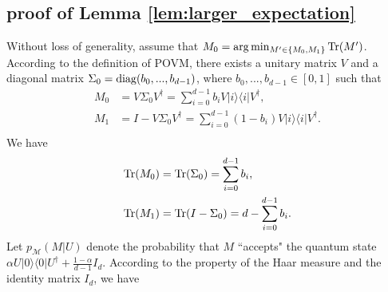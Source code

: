 \subsection{proof of Lemma \ref{lem:larger_expectation}}
\label{subsection: proof of lemma larger expectation}
    Without loss of generality, assume that $M_0 = \arg\min_{M' \in \{M_0,M_1\}} \mathrm{Tr}(M')$.  According to the definition of POVM, there exists a unitary matrix \( V \) and a diagonal matrix $ \Sigma_0 = \mathrm{diag}(b_0,...,b_{d-1})$, where $b_0,...,b_{d-1} \in [0,1]$ such that
    \begin{equation*}
        \begin{aligned}
            M_0 & = V \Sigma_0 V^\dagger = \sum_{i=0}^{d-1} b_i V |i \rangle \langle i | V^\dagger, \\
            M_1 & = I - V \Sigma_0 V^\dagger = \sum_{i=0}^{d-1} (1-b_i) V |i \rangle \langle i | V^\dagger. \\
        \end{aligned}
    \end{equation*}
    We have
    \begin{equation}
        \begin{aligned}
            & \mathrm{Tr}(M_0) = \mathrm{Tr} (\Sigma_0) = \sum_{i=0}^{d-1} b_i, \\     
            & \mathrm{Tr}(M_1) = \mathrm{Tr} (I - \Sigma_0) = d - \sum_{i=0}^{d-1} b_i.
        \end{aligned}
    \end{equation}
    Let $ p_{\mathcal{M}}(M | U) $ denote the probability that $ M $ ``accepts" the quantum state $ \alpha U | 0 \rangle \langle 0 | U^\dagger + \frac{1-\alpha}{d-1} I_d $. According to the property of the Haar measure and the identity matrix $I_d$, we have 
